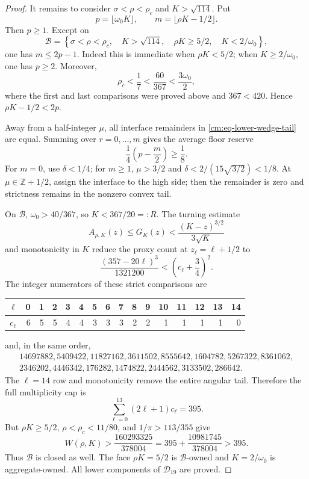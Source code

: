 \documentclass[11pt]{article}
\numberwithin{equation}{section}
\theoremstyle{definition}
\theoremstyle{remark}
\begin{document}
\begin{proof}
It remains to consider \(\sigma<\rho<\rho_c\) and
\(K>\sqrt{114}\).  Put
\[
 p=\lfloor\omega_0K\rfloor,\qquad
 m=\lfloor\rho K-1/2\rfloor.
\]
Then \(p\geq1\).  Except on
\begin{equation}
 \mathcal B=\left\{\sigma<\rho<\rho_c,\quad K>\sqrt{114},\quad
 \rho K\geq5/2,\quad K<2/\omega_0\right\},
 \label{cm:eq-exceptional-B}
\end{equation}
one has \(m\leq2p-1\).  Indeed this is immediate when \(\rho K<5/2\);
when \(K\geq2/\omega_0\), one has \(p\geq2\).  Moreover,
\[
 \rho_c<\frac17<\frac{60}{367}<\frac{3\omega_0}{2},
\]
where the first and last comparisons were proved above and
\(367<420\).  Hence \(\rho K-1/2<2p\).

Away from a half-integer \(\mu\), all interface remainders in
\eqref{cm:eq-lower-wedge-tail} are equal.  Summing over
\(r=0,\ldots,m\) gives the average floor reserve
\[
 \frac14\left(p-\frac m2\right)\geq\frac18.
\]
For \(m=0\), use \(\delta<1/4\); for \(m\geq1\), \(\mu>3/2\) and
\(\delta<2/(15\sqrt{3/2})<1/8\).  At
\(\mu\in\mathbb Z+1/2\), assign the interface to the high side; then the
remainder is zero and strictness remains in the nonzero convex tail.

On \(\mathcal B\), \(\omega_0>40/367\), so \(K<367/20=:R\).  The
turning estimate
\[
 A_{\rho,K}(z)\leq G_K(z)<\frac{(K-z)^{3/2}}{3\sqrt K}
\]
and monotonicity in \(K\) reduce the proxy count at
\(z_\ell=\ell+1/2\) to
\[
 \frac{(357-20\ell)^3}{1321200}
 <\left(c_\ell+\frac34\right)^2.
\]
The integer numerators of these strict comparisons are
\begin{center}
\small
\begin{tabular}{c|rrrrrrrrrrrrrrr}
\(\ell\)&0&1&2&3&4&5&6&7&8&9&10&11&12&13&14\\ \hline
\(c_\ell\)&6&5&5&4&4&3&3&3&2&2&1&1&1&1&0
\end{tabular}
\end{center}
and, in the same order,
\[
\begin{gathered}
14697882,5409422,11827162,3611502,8555642,
1604782,5267322,8361062,\\
2346202,4446342,176282,1474822,2444562,3133502,286642.
\end{gathered}
\]
The \(\ell=14\) row and monotonicity remove the entire angular tail.
Therefore the full multiplicity cap is
\[
 \sum_{\ell=0}^{13}(2\ell+1)c_\ell=395.
\]
But \(\rho K\geq5/2\), \(\rho<\rho_c<11/80\), and
\(1/\pi>113/355\) give
\[
 W(\rho,K)>
 \frac{160293325}{378004}
 =395+\frac{10981745}{378004}>395.
\]
Thus \(\mathcal B\) is closed as well.  The face \(\rho K=5/2\) is
\(\mathcal B\)-owned and \(K=2/\omega_0\) is aggregate-owned.  All lower
components of \(\mathcal D_{19}\) are proved.
\end{proof}
\end{document}
